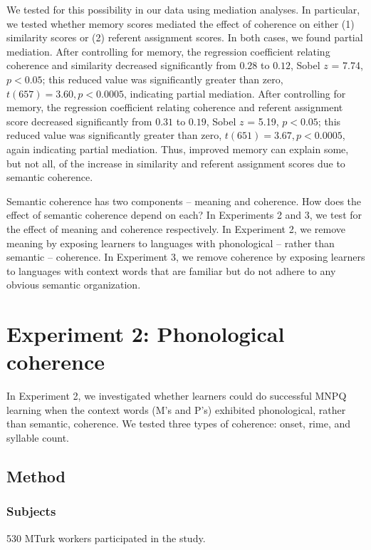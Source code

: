 \documentclass[man,floatsintext]{apa6}
\begin{document}
We tested for this possibility in our data using mediation analyses. In particular, we tested whether memory scores mediated the effect of coherence on either (1) similarity scores or (2) referent assignment scores. In both cases, we found partial mediation. After controlling for memory, the regression coefficient relating coherence and similarity decreased significantly from $0.28$ to $0.12$, Sobel $z$ = 7.74, $p < 0.05$; this reduced value was significantly greater than zero, $t(657) = 3.60, p < 0.0005$, indicating partial mediation. After controlling for memory, the regression coefficient relating coherence and referent assignment score decreased significantly from $0.31$ to $0.19$, Sobel $z$ = 5.19, $p < 0.05$; this reduced  value was significantly greater than zero, $t(651) = 3.67, p < 0.0005$, again indicating partial mediation. Thus, improved memory can explain some, but not all, of the increase in similarity and referent assignment scores due to semantic coherence.

Semantic coherence has two components -- meaning and coherence. How does the effect of semantic coherence depend on each? In Experiments 2 and 3, we test for the effect of meaning and coherence respectively. In Experiment 2, we remove meaning by exposing learners to languages with phonological -- rather than semantic -- coherence. In Experiment 3, we remove coherence by exposing learners to languages with context words that are familiar but do not adhere to any obvious semantic organization.

\section{Experiment 2: Phonological coherence}

In Experiment 2, we investigated whether learners could do successful MNPQ learning when the context words (M's and P's) exhibited phonological, rather than semantic, coherence. We tested three types of coherence: onset, rime, and syllable count.

\subsection{Method}
\subsubsection{Subjects} 530 MTurk workers participated in the study.
\end{document}
